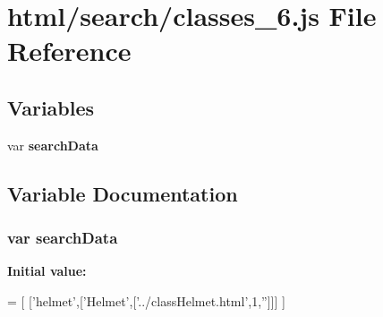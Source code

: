 \section{html/search/classes\-\_\-6.js File Reference}
\label{classes__6_8js}
\subsection*{Variables}
\begin{DoxyCompactItemize}
\item 
var {\bf search\-Data}
\end{DoxyCompactItemize}


\subsection{Variable Documentation}
\subsubsection[{search\-Data}]{\setlength{\rightskip}{0pt plus 5cm}var search\-Data}\label{classes__6_8js_ad01a7523f103d6242ef9b0451861231e}
{\bfseries Initial value\-:}
\begin{DoxyCode}
=
[
  [\textcolor{stringliteral}{'helmet'},[\textcolor{stringliteral}{'Helmet'},[\textcolor{stringliteral}{'../classHelmet.html'},1,\textcolor{stringliteral}{''}]]]
]
\end{DoxyCode}
